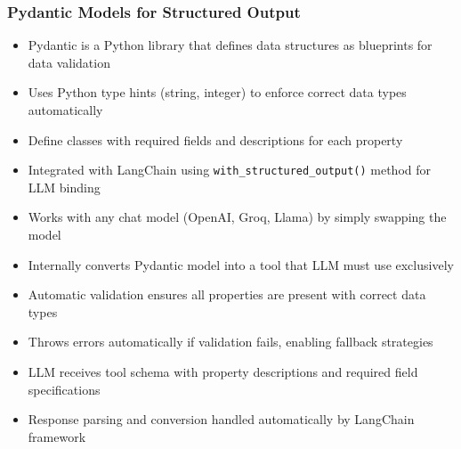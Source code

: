\begin{frame}[fragile]\frametitle{Pydantic Models for Structured Output}
      \begin{itemize}
	\item Pydantic is a Python library that defines data structures as blueprints for data validation
	\item Uses Python type hints (string, integer) to enforce correct data types automatically
	\item Define classes with required fields and descriptions for each property
	\item Integrated with LangChain using \texttt{with\_structured\_output()} method for LLM binding
	\item Works with any chat model (OpenAI, Groq, Llama) by simply swapping the model
	\item Internally converts Pydantic model into a tool that LLM must use exclusively
	\item Automatic validation ensures all properties are present with correct data types
	\item Throws errors automatically if validation fails, enabling fallback strategies
	\item LLM receives tool schema with property descriptions and required field specifications
	\item Response parsing and conversion handled automatically by LangChain framework
	  \end{itemize}
\end{frame}

